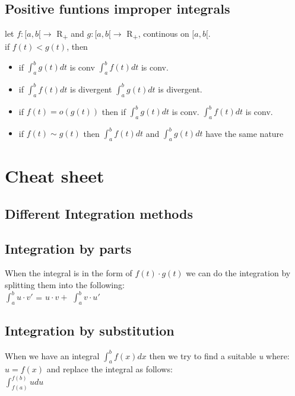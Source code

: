 \documentclass{article}
\begin{document}
\subsection{Positive funtions improper integrals}
let $f: [ a, b [ \rightarrow $ R\textsubscript{+} and $g: [ a, b [ \rightarrow $ R\textsubscript{+}, continous on $ [a, b [ $.\\
if $f(t) < g(t)$, then\\
\begin{itemize}
    \item if $\int _ { a } ^ { b } g ( t ) d t$ is conv \Rightarrow $\int _ { a } ^ { b } f ( t ) d t$ is conv.\\ 
    \item if $\int _ { a } ^ { b } f ( t ) d t$ is divergent \Rightarrow $\int _ { a } ^ { b } g ( t ) d t$ is divergent.\\
    \item if $f(t) =  o (g(t)) $ then if $\int _ { a } ^ { b } g ( t ) d t$ is conv. \Rightarrow $\int _ { a } ^ { b } f ( t ) d t$ is conv.\\
    \item if $f(t) \sim g(t) $ then $\int _ { a } ^ { b } f ( t ) d t$ and $\int _ { a } ^ { b } g ( t ) d t $ have the same nature\\ 
\end{itemize}
\section{Cheat sheet}
\subsection{Different Integration methods}
\subsection{Integration by parts}
When the integral is in the form of $f(t)\cdot g(t)$ we can do the integration by splitting them into the following:\\
$\int_{a}^{b} u \cdot v'$ = $u\cdot v + $ $\int_{a}^{b} v\cdot u'$\\
\subsection{Integration by substitution}
When we have an integral $\int_{a}^{b} f(x) dx$ then we try to find a suitable \textit{u} where:\\
$u = f(x)$ and replace the integral as follows:\\
$\int_{f(a)}^{f(b)} u du $\\
\\
\end{document}

